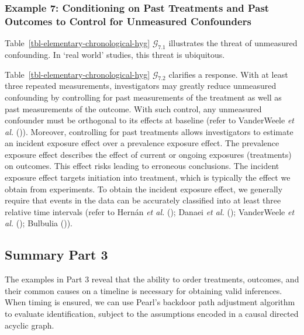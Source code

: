 \documentclass[
  single column]{article}
\begin{document}
\subsubsection{Example 7: Conditioning on Past Treatments and Past
Outcomes to Control for Unmeasured
Confounders}\label{example-7-conditioning-on-past-treatments-and-past-outcomes-to-control-for-unmeasured-confounders}

Table~\ref{tbl-elementary-chronological-hyg} \(\mathcal{G}_{7.1}\)
illustrates the threat of unmeasured confounding. In `real world'
studies, this threat is ubiquitous.

Table~\ref{tbl-elementary-chronological-hyg} \(\mathcal{G}_{7.2}\)
clarifies a response. With at least three repeated measurements,
investigators may greatly reduce unmeasured confounding by controlling
for past measurements of the treatment as well as past measurements of
the outcome. With such control, any unmeasured confounder must be
orthogonal to its effects at baseline (refer to VanderWeele \emph{et
al.} ()). Moreover, controlling for
past treatments allows investigators to estimate an incident exposure
effect over a prevalence exposure effect. The prevalence exposure effect
describes the effect of current or ongoing exposures (treatments) on
outcomes. This effect risks leading to erroneous conclusions. The
incident exposure effect targets initiation into treatment, which is
typically the effect we obtain from experiments. To obtain the incident
exposure effect, we generally require that events in the data can be
accurately classified into at least three relative time intervals (refer
to Hernán \emph{et al.} (); Danaei
\emph{et al.} (); VanderWeele \emph{et
al.} (); Bulbulia
()).

\subsection{Summary Part 3}\label{summary-part-3}

The examples in Part 3 reveal that the ability to order treatments,
outcomes, and their common causes on a timeline is necessary for
obtaining valid inferences. When timing is ensured, we can use Pearl's
backdoor path adjustment algorithm to evaluate identification, subject
to the assumptions encoded in a causal directed acyclic graph.

\newpage{}
\end{document}
